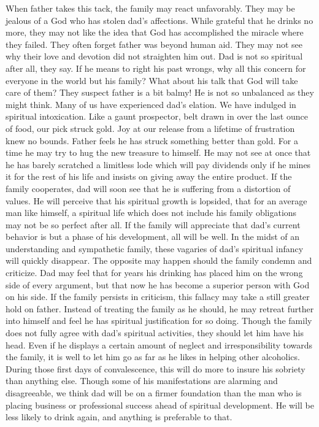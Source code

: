 \begin{biblechapter}
When father takes this tack, the family may react unfavorably.  They may be jealous of a God who has stolen dad's affections.  While grateful that he drinks no more, they may not like the idea that God has accomplished the miracle where they failed.  They often forget father was beyond human aid.  They may not see why their love and devotion did not straighten him out.  Dad is not so spiritual after all, they say.  If he means to right his past wrongs, why all this concern for everyone in the world but his family?  What about his talk that God will take care of them?  They suspect father is a bit balmy!
He is not so unbalanced as they might think.  Many of us have experienced dad's elation.  We have indulged in spiritual intoxication.  Like a gaunt prospector, belt drawn in over the last ounce of food, our pick struck gold.  Joy at our release from a lifetime of frustration knew no bounds.  Father feels he has struck something better than gold.  For a time he may try to hug the new treasure to himself.  He may not see at once that he has barely scratched a limitless lode which will pay dividends only if he mines it for the rest of his life and insists on giving away the entire product. 
If the family cooperates, dad will soon see that he is suffering from a distortion of values.  He will perceive that his spiritual growth is lopsided, that for an average man like himself, a spiritual life which does not include his family obligations may not be so perfect after all.  If the family will appreciate that dad's current behavior is but a phase of his development, all will be well.  In the midst of an understanding and sympathetic family, these vagaries of dad's spiritual infancy will quickly disappear.
The opposite may happen should the family condemn and criticize.  Dad may feel that for years his drinking has placed him on the wrong side of every argument, but that now he has become a superior person with God on his side.  If the family persists in criticism, this fallacy may take a still greater hold on father.  Instead of treating the family as he should, he may retreat further into himself and feel he has spiritual justification for so doing.
Though the family does not fully agree with dad's spiritual activities, they should let him have his head.  Even if he displays a certain amount of neglect and irresponsibility towards the family, it is well to let him go as far as he likes in helping other alcoholics.  During those first days of convalescence, this will do more to insure his sobriety than anything else.  Though some of his manifestations are alarming and disagreeable, we think dad will be on a firmer foundation than the man who is placing business or professional success ahead of spiritual development.  He will be less likely to drink again, and anything is preferable to that.

\end{biblechapter}
